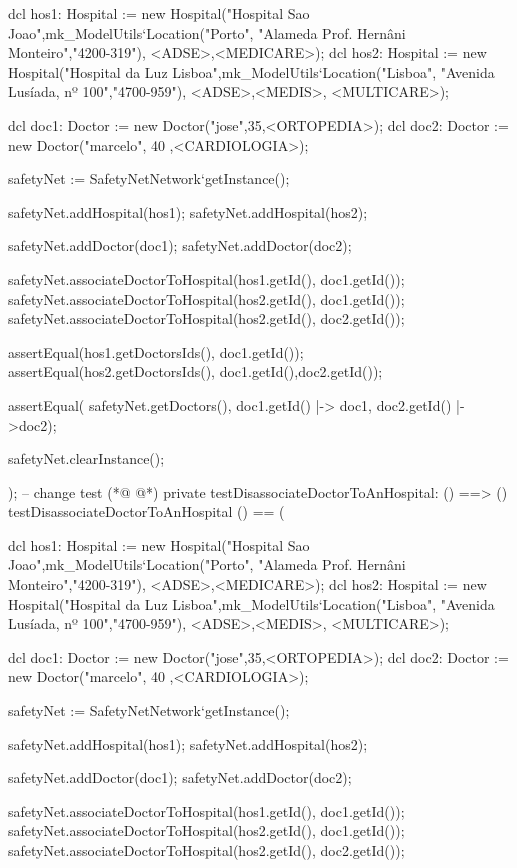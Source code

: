 \begin{vdmpp}[breaklines=true]
  dcl hos1: Hospital := new Hospital("Hospital Sao Joao",mk_ModelUtils`Location("Porto", "Alameda Prof. Hernâni Monteiro","4200-319"), {<ADSE>,<MEDICARE>});
  dcl hos2: Hospital := new Hospital("Hospital da Luz Lisboa",mk_ModelUtils`Location("Lisboa", "Avenida Lusíada, nº 100","4700-959"), {<ADSE>,<MEDIS>, <MULTICARE>}); 
  
  dcl doc1: Doctor := new Doctor("jose",35,<ORTOPEDIA>);
  dcl doc2: Doctor := new Doctor("marcelo", 40 ,<CARDIOLOGIA>);
  
  safetyNet := SafetyNetNetwork`getInstance();
   
  safetyNet.addHospital(hos1);
  safetyNet.addHospital(hos2);
  
  safetyNet.addDoctor(doc1);
  safetyNet.addDoctor(doc2);

  safetyNet.associateDoctorToHospital(hos1.getId(), doc1.getId());
  safetyNet.associateDoctorToHospital(hos2.getId(), doc1.getId());
  safetyNet.associateDoctorToHospital(hos2.getId(), doc2.getId());
  
  assertEqual(hos1.getDoctorsIds(), {doc1.getId()});
  assertEqual(hos2.getDoctorsIds(), {doc1.getId(),doc2.getId()});

  assertEqual( safetyNet.getDoctors(), {doc1.getId() |-> doc1, doc2.getId() |->doc2});
  
  safetyNet.clearInstance();
    
);
-- change test
(*@
\label{testDisassociateDoctorToAnHospital:282}
@*)
private testDisassociateDoctorToAnHospital: () ==> ()
 testDisassociateDoctorToAnHospital () == (
 
  dcl hos1: Hospital := new Hospital("Hospital Sao Joao",mk_ModelUtils`Location("Porto", "Alameda Prof. Hernâni Monteiro","4200-319"), {<ADSE>,<MEDICARE>});
  dcl hos2: Hospital := new Hospital("Hospital da Luz Lisboa",mk_ModelUtils`Location("Lisboa", "Avenida Lusíada, nº 100","4700-959"), {<ADSE>,<MEDIS>, <MULTICARE>});  
  
  dcl doc1: Doctor := new Doctor("jose",35,<ORTOPEDIA>);
  dcl doc2: Doctor := new Doctor("marcelo", 40 ,<CARDIOLOGIA>);
  
  safetyNet := SafetyNetNetwork`getInstance();
   
  safetyNet.addHospital(hos1);
  safetyNet.addHospital(hos2);
  
  safetyNet.addDoctor(doc1);
  safetyNet.addDoctor(doc2);

  safetyNet.associateDoctorToHospital(hos1.getId(), doc1.getId());
  safetyNet.associateDoctorToHospital(hos2.getId(), doc1.getId());
  safetyNet.associateDoctorToHospital(hos2.getId(), doc2.getId());
  

\end{vdmpp}
